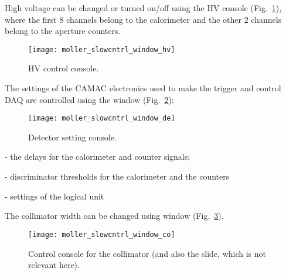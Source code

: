 {{  High voltage can be changed or turned on/off using the HV console (Fig.~\ref{fig:moller_slowc_hv}),
  where the first 8 channels belong to the calorimeter and the other 2 channels
  belong to the aperture counters.
   \begin{figure}[htb]
      \begin{center}
          \texttt{[image: moller\_slowcntrl\_window\_hv]}
      \end{center}
      \caption[M{\o}ller:HV control]{HV control console.
            }
      \label{fig:moller_slowc_hv} 
   \end{figure}  
  The settings of the CAMAC electronics used to make the trigger
  and control DAQ are controlled using the  window (Fig.~\ref{fig:moller_slowc_de}):
   \begin{figure}[htb]
      \begin{center}
          \texttt{[image: moller\_slowcntrl\_window\_de]}
      \end{center}
      \caption[M{\o}ller: electronics control]{Detector setting console.
            }
      \label{fig:moller_slowc_de} 
   \end{figure}  
   \begin{list}{--}{\setlength{\itemsep}{-0.15cm}}
     \item {} - the delays for the calorimeter and counter signals;
     \item {} - discriminator thresholds for the calorimeter and the counters
     \item {} - settings of the logical unit
   \end{list}
  The collimator width can be changed using
   window (Fig.~\ref{fig:moller_slowc_co}).
   \begin{figure}[htb]
      \begin{center}
          \texttt{[image: moller\_slowcntrl\_window\_co]}
      \end{center}
      \caption[M{\o}ller: collimator control]{Control console for the collimator 
               (and also the slide, which is not relevant here).
            }
      \label{fig:moller_slowc_co} 
   \end{figure}  
}

}

